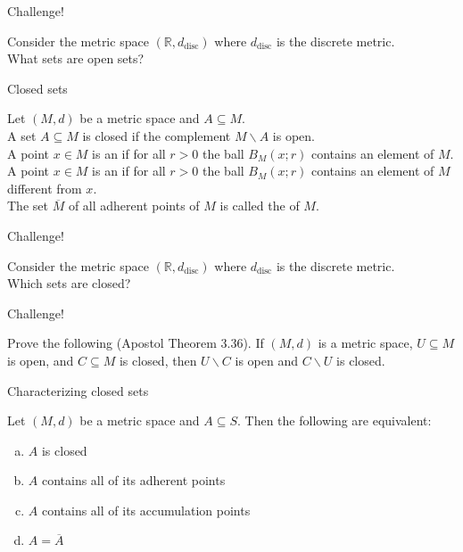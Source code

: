 \documentclass{beamer}
\begin{document}
\begin{frame}{Challenge!}
\begin{prob}
Consider the metric space $(\mathbb{R},d_{\text{disc}})$ where $d_{\text{disc}}$ is the discrete metric.\\
What sets are open sets?
\end{prob}
\end{frame}

\begin{frame}{Closed sets}
\begin{defn}
\pause
Let $(M,d)$ be a metric space and $A\subseteq M$.\\
\pause
A set $A\subseteq M$ is closed if the complement $M\backslash A$ is open.\\
\pause
A point $ x\in M$ is an  if for all $r>0$ the ball $B_M( x; r)$ contains an element of $M$.\\
\pause
A point $ x\in M$ is an  if for all $r>0$ the ball $B_M( x; r)$ contains an element of $M$ different from $x$.\\
\pause
The set $\overline M$ of all adherent points of $M$ is called the  of $M$.
\end{defn}
\end{frame}


\begin{frame}{Challenge!}
\begin{prob}
Consider the metric space $(\mathbb{R},d_{\text{disc}})$ where $d_{\text{disc}}$ is the discrete metric.\\
Which sets are closed?
\end{prob}
\end{frame}

\begin{frame}{Challenge!}
\begin{prob}
Prove the following (Apostol Theorem 3.36).
If $(M,d)$ is a metric space, $U\subseteq M$ is open, and $C\subseteq M$ is closed, then $U\backslash C$ is open and $C\backslash U$ is closed.
\end{prob}
\end{frame}

\begin{frame}{Characterizing closed sets}
\begin{thm}
Let $(M,d)$ be a metric space and $A\subseteq S$.  Then the following are equivalent:
\begin{enumerate}[(a)]
\pause
\item $A$ is closed
\pause
\item $A$ contains all of its adherent points
\pause
\item $A$ contains all of its accumulation points
\pause
\item $A=\overline{A}$
\end{enumerate}
\end{thm}
\end{frame}
\end{document}
